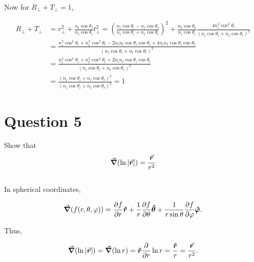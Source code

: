 \documentclass[a4paper]{article}
\begin{document}
Now for $R_\perp  + T_\perp = 1$,

\begin{align}
    R_\perp  + T_\perp &= r_\perp^2 + \frac{n_t \cos \theta_t}{n_i \cos \theta_i}t_\perp^2 = \left(\frac{n_i \cos \theta_i - n_t \cos \theta_t}{n_i \cos \theta_i + n_t \cos \theta_t}\right)^2 + \frac{n_t \cos \theta_t}{n_i \cos \theta_i} \frac{4 n_i^2 \cos^2 \theta_i}{\left(n_i \cos \theta_i + n_t \cos \theta_t\right)^2}\\
    &= \frac{n_i^2 \cos^2 \theta_i + n_t^2 \cos^2 \theta_t - 2 n_i n_t \cos \theta_i \cos \theta_t + 4 n_i n_t \cos \theta_i \cos \theta_t}{\left(n_i \cos \theta_i + n_t \cos \theta_t\right)^2}\\
    &= \frac{n_i^2 \cos^2 \theta_i + n_t^2 \cos^2 \theta_t + 2 n_i n_t \cos \theta_i \cos \theta_t}{\left(n_i \cos \theta_i + n_t \cos \theta_t\right)^2}\\
    &=\frac{\left(n_i \cos \theta_i + n_t \cos \theta_t\right)^2}{\left(n_i \cos \theta_i + n_t \cos \theta_t\right)^2} = 1
\end{align}

\section*{Question 5}
Show that 
\[
    \grad({\ln \abs{\va*{r}}}) = \frac{\va*{r}}{r^2}
\]\\

In spherical coordinates,

\[
    \grad(f(r, \theta, \varphi)) = \pdv{f}{r} \vu*{r} + \frac{1}{r} \pdv{f}{\theta} \vu*{\theta} + \frac{1}{r \sin \theta}\pdv{f}{\varphi} \vu*{\varphi}.
\]

Thus,

\[
    \grad(\ln \abs{\va*{r}}) = \grad(\ln r) =  \vu*{r}\pdv{r} \ln r = \frac{\vu*{r}}{r} = \frac{\va*{r}}{r^2}.
\]
\end{document}
